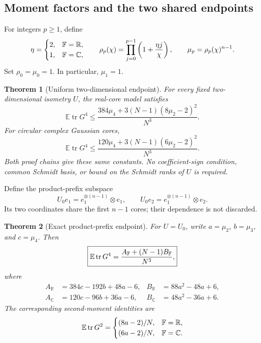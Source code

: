 \documentclass[11pt]{article}
\numberwithin{equation}{section}
\newtheorem{theorem}{Theorem}[section]
\theoremstyle{definition}\newtheorem{definition}[theorem]{Definition}
\theoremstyle{remark}\newtheorem{remark}[theorem]{Remark}
\newcommand{\R}{\mathbb R}\newcommand{\E}{\mathbb E}\newcommand{\Prob}{\mathbb P}
\newcommand{\tr}{\operatorname{tr}}\newcommand{\Ent}{\operatorname{Ent}}
\newcommand{\C}{\mathbb C}
\begin{document}
\subsection{Moment factors and the two shared endpoints}
For integers $p\ge1$, define
\begin{equation}\label{eq:rho}
 \eta=\begin{cases}2,&\F=\R,\\1,&\F=\C,\end{cases}\qquad
 \rho_p(\chi)=\prod_{j=0}^{p-1}\left(1+\frac{\eta j}{\chi}\right),\qquad
 \mu_p=\rho_p(\chi)^{n-1}.
\end{equation}
Set $\rho_0=\mu_0=1$. In particular, $\mu_1=1$.

\begin{theorem}[Uniform two-dimensional endpoint]\label{thm:uniform}
For every fixed two-dimensional isometry $U$, the real-core model satisfies
\begin{equation}\label{eq:uniformR}
 \boxed{\displaystyle
 \E\tr G^4\le
 \frac{384\mu_4+3(N-1)(8\mu_2-2)^2}{N^3}.}
\end{equation}
For circular complex Gaussian cores,
\begin{equation}\label{eq:uniformC}
 \boxed{\displaystyle
 \E\tr G^4\le
 \frac{120\mu_4+3(N-1)(6\mu_2-2)^2}{N^3}.}
\end{equation}
Both proof chains give these same constants. No coefficient-sign condition,
common Schmidt basis, or bound on the Schmidt ranks of $U$ is required.
\end{theorem}

Define the product-prefix subspace
\begin{equation}\label{eq:prefixU}
 U_0e_1=e_1^{\otimes(n-1)}\otimes e_1,\qquad
 U_0e_2=e_1^{\otimes(n-1)}\otimes e_2.
\end{equation}
Its two coordinates share the first $n-1$ cores; their dependence is not discarded.

\begin{theorem}[Exact product-prefix endpoint]\label{thm:exact}
For $U=U_0$, write $a=\mu_2$, $b=\mu_3$, and $c=\mu_4$. Then
\begin{equation}\label{eq:exact}
 \boxed{\displaystyle\E\tr G^4=\frac{A_{\F}+(N-1)B_{\F}}{N^3},}
\end{equation}
where
\begin{align}
 A_{\R}&=384c-192b+48a-6,
 &B_{\R}&=88a^2-48a+6,\label{eq:ABR}\\
 A_{\C}&=120c-96b+36a-6,
 &B_{\C}&=48a^2-36a+6.\label{eq:ABC}
\end{align}
The corresponding second-moment identities are
\begin{equation}\label{eq:second}
 \E\tr G^2=\begin{cases}(8a-2)/N,&\F=\R,\\(6a-2)/N,&\F=\C.\end{cases}
\end{equation}
\end{theorem}
\end{document}
